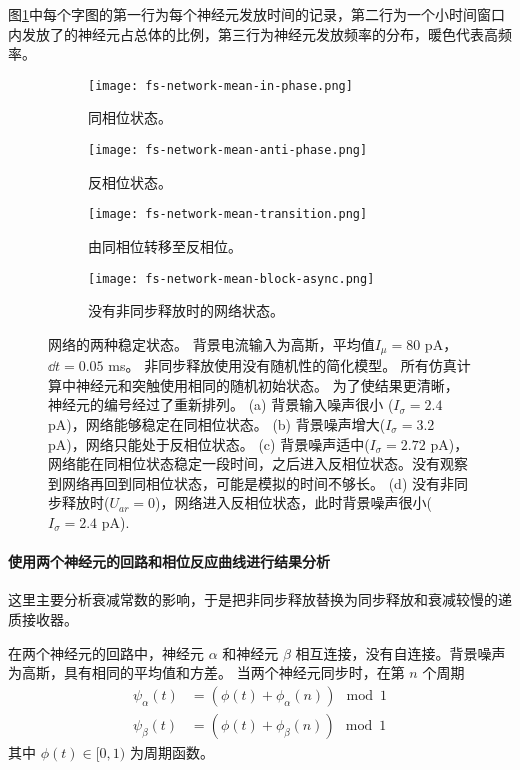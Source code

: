 图\ref{figure:network-stability}中每个字图的第一行为每个神经元发放时间的记录，第二行为一个小时间窗口内发放了的神经元占总体的比例，第三行为神经元发放频率的分布，暖色代表高频率。


\begin{figure}
\centering
    \begin{subfigure}{0.45\textwidth}
        \texttt{[image: fs-network-mean-in-phase.png]}
        \caption{同相位状态。}
    \end{subfigure}
    \begin{subfigure}{0.45\textwidth}
        \texttt{[image: fs-network-mean-anti-phase.png]}
        \caption{反相位状态。}
    \end{subfigure}
    \begin{subfigure}{0.45\textwidth}
        \texttt{[image: fs-network-mean-transition.png]}
        \caption{由同相位转移至反相位。}
    \end{subfigure}
    \begin{subfigure}{0.45\textwidth}
        \texttt{[image: fs-network-mean-block-async.png]}
        \caption{没有非同步释放时的网络状态。}
    \end{subfigure}
\caption{网络的两种稳定状态。
背景电流输入为高斯，平均值$I_{\mu} = 80$ pA，$\dd{t} = 0.05$ ms。
非同步释放使用没有随机性的简化模型。
所有仿真计算中神经元和突触使用相同的随机初始状态。
为了使结果更清晰，神经元的编号经过了重新排列。
(a) 背景输入噪声很小 ($I_{\sigma} = 2.4$ pA)，网络能够稳定在同相位状态。
(b) 背景噪声增大($I_{\sigma} = 3.2$ pA)，网络只能处于反相位状态。
(c) 背景噪声适中($I_{\sigma} = 2.72$ pA)，网络能在同相位状态稳定一段时间，之后进入反相位状态。没有观察到网络再回到同相位状态，可能是模拟的时间不够长。
(d) 没有非同步释放时($U_{ar} = 0$)，网络进入反相位状态，此时背景噪声很小($I_{\sigma} = 2.4$ pA).}
\label{figure:network-stability}
\end{figure}

\paragraph{使用两个神经元的回路和相位反应曲线进行结果分析}
这里主要分析衰减常数的影响，于是把非同步释放替换为同步释放和衰减较慢的递质接收器。

在两个神经元的回路中，神经元 $\alpha$ 和神经元 $\beta$ 相互连接，没有自连接。背景噪声为高斯，具有相同的平均值和方差。
当两个神经元同步时，在第 $n$ 个周期
\begin{align}
\psi_{\alpha}\left(t\right) &= \left(\phi\left(t\right) + \phi_{\alpha}\left(n\right)\right) \mod 1 \\
\psi_{\beta}\left(t\right) &= \left(\phi\left(t\right) + \phi_{\beta}\left(n\right)\right) \mod 1
\end{align}
其中 $\phi\left(t\right) \in [0,1)$ 为周期函数。

